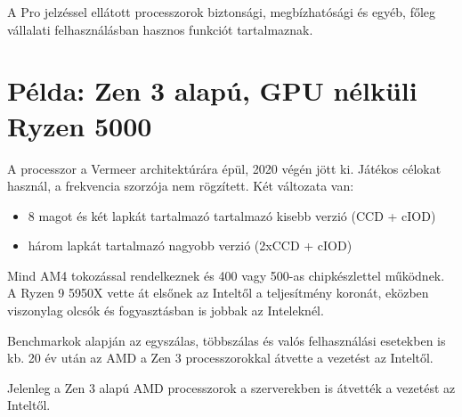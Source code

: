 A Pro jelzéssel ellátott processzorok biztonsági, megbízhatósági és egyéb, főleg vállalati felhasználásban hasznos funkciót tartalmaznak.

\section{Példa: Zen 3 alapú, GPU nélküli Ryzen 5000}
A processzor a Vermeer architektúrára épül, 2020 végén jött ki.
Játékos célokat használ, a frekvencia szorzója nem rögzített.
Két változata van:
\begin{itemize}
    \item 8 magot és két lapkát tartalmazó tartalmazó kisebb verzió (CCD + cIOD)
    \item három lapkát tartalmazó nagyobb verzió (2xCCD + cIOD)
\end{itemize}
Mind AM4 tokozással rendelkeznek és 400 vagy 500-as chipkészlettel működnek.
A Ryzen 9 5950X vette át elsőnek az Inteltől a teljesítmény koronát, eközben viszonylag olcsók és fogyasztásban is jobbak az Inteleknél.

Benchmarkok alapján az egyszálas, többszálas és valós felhasználási esetekben is kb. 20 év után az AMD a Zen 3 processzorokkal átvette a vezetést az Inteltől.

Jelenleg a Zen 3 alapú AMD processzorok a szerverekben is átvették a vezetést az Inteltől.
